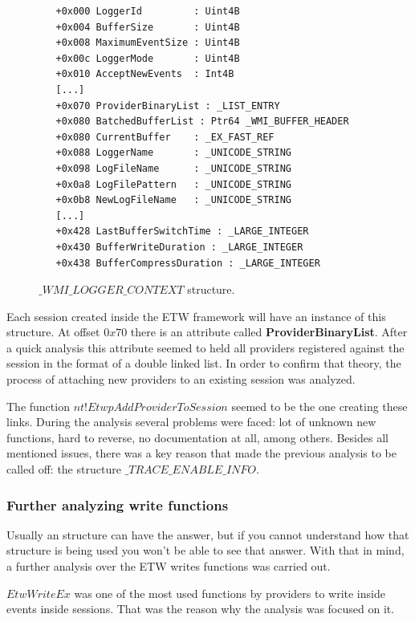 \begin{figure}[H]
  \begin{lstlisting}
   +0x000 LoggerId         : Uint4B
   +0x004 BufferSize       : Uint4B
   +0x008 MaximumEventSize : Uint4B
   +0x00c LoggerMode       : Uint4B
   +0x010 AcceptNewEvents  : Int4B
   [...]
   +0x070 ProviderBinaryList : _LIST_ENTRY
   +0x080 BatchedBufferList : Ptr64 _WMI_BUFFER_HEADER
   +0x080 CurrentBuffer    : _EX_FAST_REF
   +0x088 LoggerName       : _UNICODE_STRING
   +0x098 LogFileName      : _UNICODE_STRING
   +0x0a8 LogFilePattern   : _UNICODE_STRING
   +0x0b8 NewLogFileName   : _UNICODE_STRING
   [...]
   +0x428 LastBufferSwitchTime : _LARGE_INTEGER
   +0x430 BufferWriteDuration : _LARGE_INTEGER
   +0x438 BufferCompressDuration : _LARGE_INTEGER
  \end{lstlisting} 
  \caption[]{$\_WMI\_LOGGER\_CONTEXT$ structure.}
  \label{fig:wmi_logger_context}
\end{figure}

Each session created inside the ETW framework will have an instance of this structure. At offset $0x70$ there is an attribute called {\bfseries ProviderBinaryList}. After a quick analysis this attribute seemed to held all providers registered against the session in the format of a double linked list. In order to confirm that theory, the process of attaching new providers to an existing session was analyzed. 

The function $nt!EtwpAddProviderToSession$ seemed to be the one creating these links. During the analysis several problems were faced: lot of unknown new functions, hard to reverse, no documentation at all, among others. Besides all mentioned issues, there was a key reason that made the previous analysis to be called off: the structure $\_TRACE\_ENABLE\_INFO$.


\subsubsection{\bfseries Further analyzing write functions}

Usually an structure can have the answer, but if you cannot understand how that structure is being used you won't be able to see that answer. With that in mind, a further analysis over the ETW writes functions was carried out.

$EtwWriteEx$ was one of the most used functions by providers to write inside events inside sessions. That was the reason why the analysis was focused on it.

